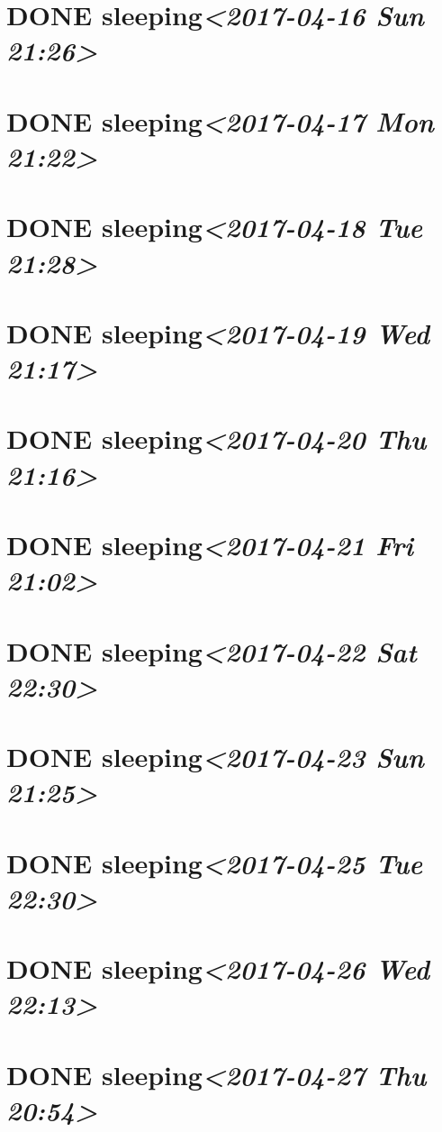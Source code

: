 \documentclass[cyan]{elegantnote}
\begin{document}
\section{{\bfseries\sffamily DONE} sleeping\textit{<2017-04-16 Sun 21:26>}}
\label{sec:orge3ffddd}
\section{{\bfseries\sffamily DONE} sleeping\textit{<2017-04-17 Mon 21:22>}}
\label{sec:orgaa22ab4}
\section{{\bfseries\sffamily DONE} sleeping\textit{<2017-04-18 Tue 21:28>}}
\label{sec:org924c68b}
\section{{\bfseries\sffamily DONE} sleeping\textit{<2017-04-19 Wed 21:17>}}
\label{sec:orgdbc6d86}
\section{{\bfseries\sffamily DONE} sleeping\textit{<2017-04-20 Thu 21:16>}}
\label{sec:org4f4fc95}
\section{{\bfseries\sffamily DONE} sleeping\textit{<2017-04-21 Fri 21:02>}}
\label{sec:org1186e26}
\section{{\bfseries\sffamily DONE} sleeping\textit{<2017-04-22 Sat 22:30>}}
\label{sec:org1420aac}
\section{{\bfseries\sffamily DONE} sleeping\textit{<2017-04-23 Sun 21:25>}}
\label{sec:org40846c0}
\section{{\bfseries\sffamily DONE} sleeping\textit{<2017-04-25 Tue 22:30>}}
\label{sec:org86d4ada}
\section{{\bfseries\sffamily DONE} sleeping\textit{<2017-04-26 Wed 22:13>}}
\label{sec:org64b7938}
\section{{\bfseries\sffamily DONE} sleeping\textit{<2017-04-27 Thu 20:54>}}
\label{sec:org145be40}
\end{document}
